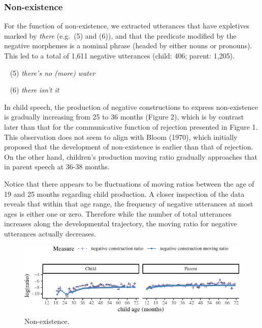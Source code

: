 \documentclass[10pt, letterpaper]{article}
\newenvironment{CodeChunk}{}{}
\begin{document}
\hypertarget{non-existence}{%
\subsubsection{Non-existence}\label{non-existence}}

For the function of non-existence, we extracted utterances that have
expletives marked by \emph{there} (e.g.~(5) and (6)), and that the
predicate modified by the negative morphemes is a nominal phrase (headed
by either nouns or pronouns). This led to a total of 1,611 negative
utterances (child: 406; parent: 1,205).

~ (5) \emph{there's no (more) water}

~ (6) \emph{there isn't it}

In child speech, the production of negative constructions to express
non-existence is gradually increasing from 25 to 36 months (Figure 2),
which is by contrast later than that for the communicative function of
rejection presented in Figure 1. This observation does not seem to align
with Bloom (1970), which initially proposed that the development of
non-existence is earlier than that of rejection. On the other hand,
children's production moving ratio gradually approaches that in parent
speech at 36-38 months.

Notice that there appears to be fluctuations of moving ratios between
the age of 19 and 25 months regarding child production. A closer
inspection of the data reveals that within that age range, the frequency
of negative utterances at most ages is either one or zero. Therefore
while the number of total utterances increases along the developmental
trajectory, the moving ratio for negative utterances actually decreases.

\begin{figure}[h]

\begin{CodeChunk}


\begin{center}\includegraphics{figs/existence-1} \end{center}

\end{CodeChunk}
\caption[This image spans both columns]{Non-existence.}\label{fig:non-existence}
\end{figure}
\end{document}
